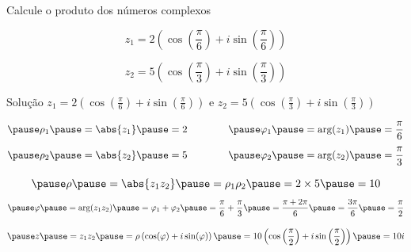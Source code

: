 \begin{question}
  Calcule o produto dos números complexos

  \[
    z_1 = 2\left(\cos\left(\frac{\pi}{6}\right) + i\sin\left(\frac{\pi}{6}\right)\right)
  \]

  \[
    z_2 = 5\left(\cos\left(\frac{\pi}{3}\right) + i\sin\left(\frac{\pi}{3}\right)\right)
  \]
\end{question}

\begin{resolution}{Solução}
  \(z_1 = 2\left(\cos\left(\frac{\pi}{6}\right) + i\sin\left(\frac{\pi}{6}\right)\right)\) e
  \(z_2 = 5\left(\cos\left(\frac{\pi}{3}\right) + i\sin\left(\frac{\pi}{3}\right)\right)\)

  \[
    \pause \rho_1
    \pause = \abs{z_1}
    \pause = 2
    \qquad\qquad
    \pause \varphi_1
    \pause = \arg(z_1)
    \pause = \frac{\pi}{6}
  \]
  \[
    \pause \rho_2
    \pause = \abs{z_2}
    \pause = 5
    \qquad\qquad
    \pause \varphi_2
    \pause = \arg(z_2)
    \pause = \frac{\pi}{3}
  \]

  \[
    \pause \rho
    \pause = \abs{z_1z_2}
    \pause = \rho_1 \rho_2
    \pause = 2 \times 5
    \pause = 10
  \]
  \[
    \pause \varphi
    \pause = \arg(z_1z_2)
    \pause = \varphi_1 + \varphi_2
    \pause = \frac{\pi}{6} + \frac{\pi}{3}
    \pause = \frac{\pi + 2\pi}{6}
    \pause = \frac{3\pi}{6}
    \pause = \frac{\pi}{2}
  \]

  \[
    \pause z
    \pause = z_1 z_2
    \pause = \rho\left(\cos(\varphi)+i\sin(\varphi)\right)
    \pause = 10\left(\cos\left(\frac{\pi}{2}\right)+i\sin\left(\frac{\pi}{2}\right)\right)
    \pause = 10i
  \]
\end{resolution}


